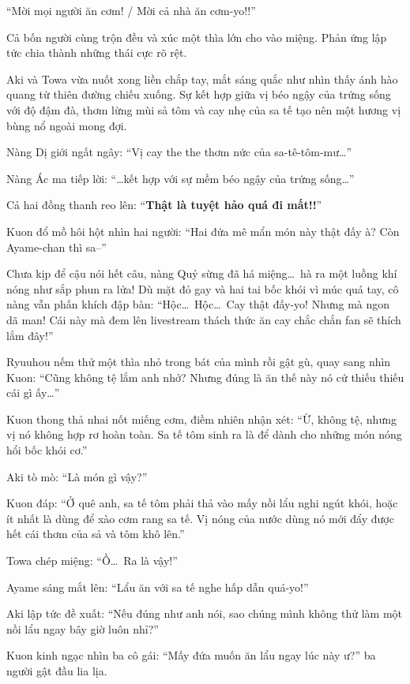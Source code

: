 \documentclass[../main.tex]{subfiles}
\begin{document}
``Mời mọi người ăn cơm! / Mời cả nhà ăn cơm-yo!!''

Cả bốn người cùng trộn đều và xúc một thìa lớn cho vào miệng. Phản ứng lập tức chia thành những thái cực rõ rệt.

Aki và Towa vừa nuốt xong liền chắp tay, mắt sáng quắc như nhìn thấy ánh hào quang từ thiên đường chiếu xuống. Sự kết hợp giữa vị béo ngậy của trứng sống với độ đậm đà, thơm lừng mùi sả tôm và cay nhẹ của sa tế tạo nên một hương vị bùng nổ ngoài mong đợi.

Nàng Dị giới ngất ngây: ``Vị cay the the thơm nức của sa-tê-tôm-mư\dots''

Nàng Ác ma tiếp lời: ``\dots kết hợp với sự mềm béo ngậy của trứng sống\dots''

Cả hai đồng thanh reo lên: ``\textbf{Thật là tuyệt hảo quá đi mất!!}''

Kuon đổ mồ hôi hột nhìn hai người: ``Hai đứa mê mẩn món này thật đấy à? Còn Ayame-chan thì sa--''

Chưa kịp để cậu nói hết câu, nàng Quỷ sừng đã há miệng\dots\ hà ra một luồng khí nóng như sắp phun ra lửa! Dù mặt đỏ gay và hai tai bốc khói vì múc quá tay, cô nàng vẫn phấn khích đập bàn: ``Hộc\dots\ Hộc\dots\ Cay thật đấy-yo! Nhưng mà ngon dã man! Cái này mà đem lên livestream thách thức ăn cay chắc chắn fan sẽ thích lắm đây!''

Ryuuhou nếm thử một thìa nhỏ trong bát của mình rồi gật gù, quay sang nhìn Kuon: ``Cũng không tệ lắm anh nhở? Nhưng đúng là ăn thế này nó cứ thiếu thiếu cái gì ấy\dots''

Kuon thong thả nhai nốt miếng cơm, điềm nhiên nhận xét: ``Ừ, không tệ, nhưng vị nó không hợp rơ hoàn toàn. Sa tế tôm sinh ra là để dành cho những món nóng hổi bốc khói cơ.''

Aki tò mò: ``Là món gì vậy?''

Kuon đáp: ``Ở quê anh, sa tế tôm phải thả vào mấy nồi lẩu nghi ngút khói, hoặc ít nhất là dùng để xào cơm rang sa tế. Vị nóng của nước dùng nó mới đẩy được hết cái thơm của sả và tôm khô lên.''

Towa chép miệng: ``Ồ\dots\ Ra là vậy!''

Ayame sáng mắt lên: ``Lẩu ăn với sa tế nghe hấp dẫn quá-yo!''

Aki lập tức đề xuất: ``Nếu đúng như anh nói, sao chúng mình không thử làm một nồi lẩu ngay bây giờ luôn nhỉ?''

Kuon kinh ngạc nhìn ba cô gái: ``Mấy đứa muốn ăn lẩu ngay lúc này ư?'' ba người gật đầu lia lịa.
\end{document}
